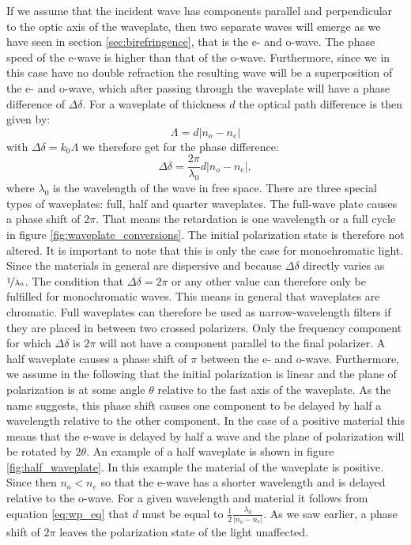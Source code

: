 If we assume that the incident wave has components parallel and perpendicular to the optic axis of the waveplate, then two separate waves will emerge as we have seen in section \ref{sec:birefringence}, that is the e- and o-wave. The phase speed of the e-wave is higher than that of the o-wave. Furthermore, since we in this case have no double refraction the resulting wave will be a superposition of the e- and o-wave, which after passing through the waveplate will have a phase difference of $\Delta \delta$. For a waveplate of thickness $d$ the optical path difference is then given by:
\begin{equation}
    \Lambda = d|n_o - n_e|
\end{equation}
with $\Delta \delta = k_0 \Lambda$ we therefore get for the phase difference:
\begin{equation}
    \label{eq:wp_eq}
    \Delta \delta = \frac{2\pi}{\lambda_0}d|n_o - n_e|,
\end{equation}
where $\lambda_0$ is the wavelength of the wave in free space. There are three special types of waveplates: full, half and quarter waveplates. The full-wave plate causes a phase shift of $2\pi$. That means the retardation is one wavelength or a full cycle in figure \ref{fig:waveplate_conversions}. The initial polarization state is therefore not altered. It is important to note that this is only the case for monochromatic light. Since the materials in general are dispersive and because $\Delta \delta$ directly varies as $\nicefrac{1}{\lambda_0}$. The condition that $\Delta \delta = 2\pi$ or any other value can therefore only be fulfilled for monochromatic waves. This means in general that waveplates are chromatic. Full waveplates can therefore be used as narrow-wavelength filters if they are placed in between two crossed polarizers. Only the frequency component for which $\Delta \delta$ is $2\pi$ will not have a component parallel to the final polarizer. A half waveplate causes a phase shift of $\pi$ between the e- and o-wave. Furthermore, we assume in the following that the initial polarization is linear and the plane of polarization is at some angle $\theta$ relative to the fast axis of the waveplate. As the name suggests, this phase shift causes one component to be delayed by half a wavelength relative to the other component. In the case of a positive material this means that the e-wave is delayed by half a wave and the plane of polarization will be rotated by $2\theta$. An example of a half waveplate is shown in figure \ref{fig:half_waveplate}. In this example the material of the waveplate is positive. Since then $n_o<n_e$ so that the e-wave has a shorter wavelength and is delayed relative to the o-wave. For a given wavelength and material it follows from equation \ref{eq:wp_eq} that $d$ must be equal to $\frac{1}{2}\frac{\lambda_0}{|n_o - n_e|}$. As we saw earlier, a phase shift of $2\pi$ leaves the polarization state of the light unaffected. 


